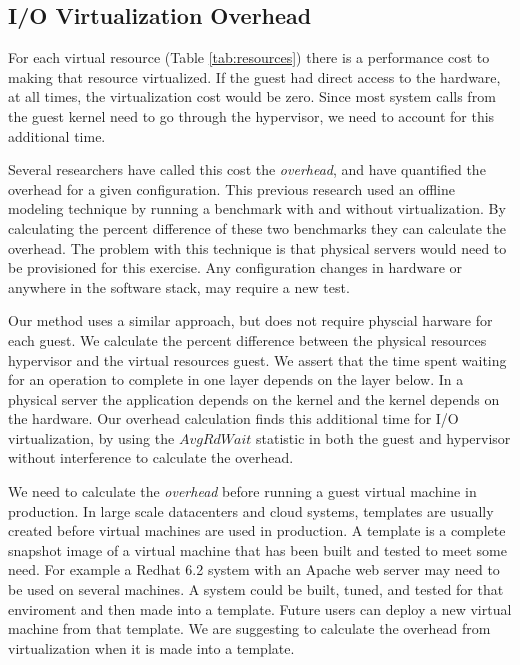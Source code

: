\subsection{I/O Virtualization Overhead}
For each virtual resource (Table \ref{tab:resources}) there is a performance cost to making that resource virtualized.  If the guest had direct access to the hardware, at all times, the virtualization cost would be zero.  Since most system calls from the guest kernel need to go through the hypervisor, we need to account for this additional time.

Several researchers \cite{cherkasova, huber1} have called this cost the \emph{overhead}, and have quantified the overhead for a given configuration.  This previous research used an offline modeling technique by running a benchmark with and without virtualization.  By calculating the percent difference of these two benchmarks they can calculate the overhead.
The problem with this technique is that physical servers would need to be provisioned for this exercise.  Any configuration changes in hardware or anywhere in the software stack, may require a new test.  

Our method uses a similar approach, but does not require physcial harware for each guest.  We calculate the percent difference between the physical resources hypervisor and the virtual resources guest. 
We assert that the time spent waiting for an operation to complete in one layer depends on the layer below.  
In a physical server the application depends on the kernel and the kernel depends on the hardware.  
Our overhead calculation finds this additional time for I/O virtualization, by using the $AvgRdWait$ statistic in both the guest and hypervisor without interference to calculate the overhead.

We need to calculate the \emph{overhead} before running a guest virtual machine in production. 
In large scale datacenters and cloud systems, templates are usually created before virtual machines are used in production.  A template is a complete snapshot image of a virtual machine that has been built and tested to meet some need.  For example a Redhat 6.2 system with an Apache web server may need to be used on several machines.  A system could be built, tuned, and tested for that enviroment and then made into a template.  Future users can deploy a new virtual machine from that template.  We are suggesting to calculate the overhead from virtualization when it is made into a template.  

